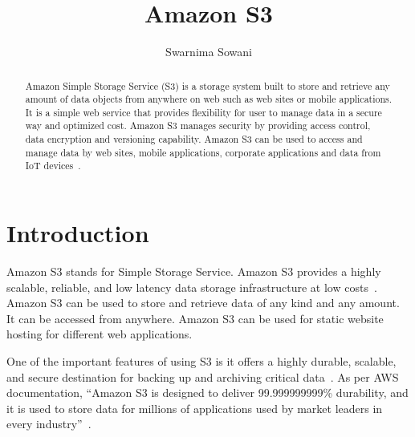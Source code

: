
\title{Amazon S3}


\author{Swarnima Sowani}

\renewcommand{\shortauthors}{G. v. Laszewski}

\begin{abstract}

Amazon Simple Storage Service (S3) is a storage system built to store and
retrieve any amount of data objects from anywhere on web such as web sites or mobile
applications. It is a simple web service that provides flexibility for user to
manage data in a secure way and optimized cost. Amazon S3 manages security by
providing access control, data encryption and versioning capability. Amazon S3
can be used to access and manage data by web sites, mobile applications,
corporate applications and data from IoT devices~\cite{hid-sp18-420-amazon-S3}.

\end{abstract}


\maketitle

\section{Introduction}

Amazon S3 stands for Simple Storage Service. Amazon S3 provides a highly
scalable, reliable, and low latency data storage infrastructure at low
costs~\cite{hid-sp18-420-amazon-S3-FAQ}. Amazon S3 can be used to store and
retrieve data of any kind and any amount. It can be accessed from anywhere.
Amazon S3 can be used for static website hosting for different web applications.

One of the important features of using S3 is it offers a highly durable,
scalable, and secure destination for backing up and archiving critical
data~\cite{hid-sp18-420-amazon-S3}. As per AWS documentation, ``Amazon S3 is
designed to deliver 99.999999999\% durability, and it is used to store data for
millions of applications used by market leaders in every
industry''~\cite{hid-sp18-420-amazon-S3}.

